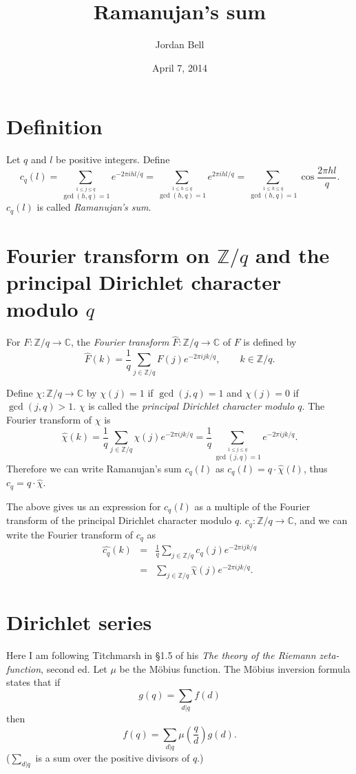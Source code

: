 \documentclass{article}
\begin{document}
\title{Ramanujan's sum}
\author{Jordan Bell}
\date{April 7, 2014}

\maketitle

\section{Definition}
Let $q$ and $l$ be positive integers.
Define
\[
c_q(l)=\sum_{\stackrel{1 \leq j \leq q}{\gcd(h,q)=1}} e^{-2\pi i  hl/q}
=\sum_{\stackrel{1 \leq h \leq q}{\gcd(h,q)=1}} e^{2\pi i  hl/q}
=\sum_{\stackrel{1 \leq h \leq q}{\gcd(h,q)=1}} \cos \frac{2\pi  hl}{q}.
\]
$c_q(l)$ is called {\em Ramanujan's sum}.

\section{Fourier transform on $\mathbb{Z}/q$ and the principal Dirichlet character modulo $q$}
For $F:\mathbb{Z}/q \to \mathbb{C}$, the {\em Fourier transform} $\widehat{F}:\mathbb{Z}/q \to \mathbb{C}$ of $F$ is defined by
\[
\widehat{F}(k)=\frac{1}{q} \sum_{j \in \mathbb{Z}/q} F(j) e^{-2\pi i  jk/q}, \qquad k \in \mathbb{Z}/q.
\]

Define $\chi:\mathbb{Z}/q \to \mathbb{C}$ by $\chi(j)=1$ if $\gcd(j,q)=1$ and $\chi(j)=0$ if $\gcd(j,q)>1$.
$\chi$ is called the {\em principal Dirichlet character modulo $q$}.
The Fourier transform of $\chi$ is
\[
\widehat{\chi}(k)=\frac{1}{q} \sum_{j \in \mathbb{Z}/q} \chi(j) e^{-2\pi i  jk/q} 
=\frac{1}{q} \sum_{\stackrel{1 \leq j \leq q}{\gcd(j,q)=1}} e^{-2\pi i  jk/q}.
\]
Therefore we can write  Ramanujan's sum $c_q(l)$ as $c_q(l)=q\cdot \widehat{\chi}(l)$, thus $c_q=q\cdot \widehat{\chi}$.

The above gives us an expression for $c_q(l)$ as a multiple of the Fourier transform of the principal Dirichlet character modulo $q$.
$c_q:\mathbb{Z}/q \to \mathbb{C}$, and we can write the Fourier transform of $c_q$ as
\begin{eqnarray*}
\widehat{c_q}(k)&=&\frac{1}{q} \sum_{j \in \mathbb{Z}/q} c_q(j)  e^{-2\pi i  jk/q}\\
&=&\sum_{j \in \mathbb{Z}/q} \widehat{\chi}(j) e^{-2\pi i  jk/q}.
\end{eqnarray*}


\section{Dirichlet series}
Here I am following Titchmarsh in \S 1.5 of his {\em The theory of the Riemann zeta-function}, second ed.
Let $\mu$ be the M\"obius function.
The M\"obius inversion formula states that if
\[
g(q)=\sum_{d|q} f(d)
\]
then
\[
f(q)=\sum_{d|q} \mu\left(\frac{q}{d} \right) g(d).
\]
($\sum_{d|q}$ is a sum over the positive divisors of $q$.)
\end{document}
